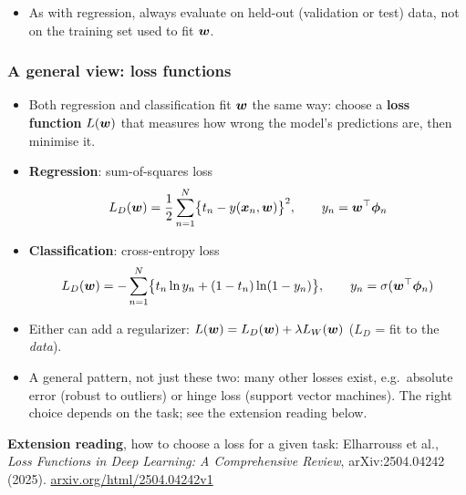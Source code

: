 \documentclass[10pt]{beamer}
\begin{document}
\begin{frame}[fragile]
\vspace{8pt}
\begin{itemize}
\item[$\Rightarrow$] As with regression, always evaluate on held-out
  (validation or test) data, not on the training set used to fit
  $\boldsymbol{w}$.
\end{itemize}

\end{frame}
\begin{frame}[fragile]
\frametitle{A general view: loss functions}

\small
\begin{itemize}
\item Both regression and classification fit $\boldsymbol{w}$ the same way:
  choose a \textbf{loss function} $L(\boldsymbol{w})$ that measures how wrong
  the model's predictions are, then minimise it.
\item \textbf{Regression}: sum-of-squares loss
\[
L_D(\boldsymbol{w}) = \frac12 \sum_{n=1}^N \bigl\{t_n - y(\boldsymbol{x}_n,\boldsymbol{w})\bigr\}^2,
\qquad y_n = \boldsymbol{w}^\top\boldsymbol\phi_n
\]
\item \textbf{Classification}: cross-entropy loss
\[
L_D(\boldsymbol{w}) = -\sum_{n=1}^N \bigl\{t_n \ln y_n + (1-t_n)\ln(1-y_n)\bigr\},
\qquad y_n = \sigma(\boldsymbol{w}^\top\boldsymbol\phi_n)
\]
\end{itemize}


\begin{itemize}
\item Either can add a regularizer: $L(\boldsymbol{w}) = L_D(\boldsymbol{w}) +
  \lambda L_W(\boldsymbol{w})$ ($L_D$ = fit to the \emph{data}).
\item[$\Rightarrow$] A general pattern, not just these two: many other
  losses exist, e.g.\ absolute error (robust to outliers) or hinge loss
  (support vector machines). The right choice depends on the task; see
  the extension reading below.
\end{itemize}

\vspace{8pt}
{\footnotesize \textbf{Extension reading}, how to choose a loss for a
given task: Elharrouss et al., \emph{Loss Functions in Deep Learning: A
Comprehensive Review}, arXiv:2504.04242 (2025).
\href{https://arxiv.org/html/2504.04242v1}{\color{blue}arxiv.org/html/2504.04242v1}}

\end{frame}
\end{document}
